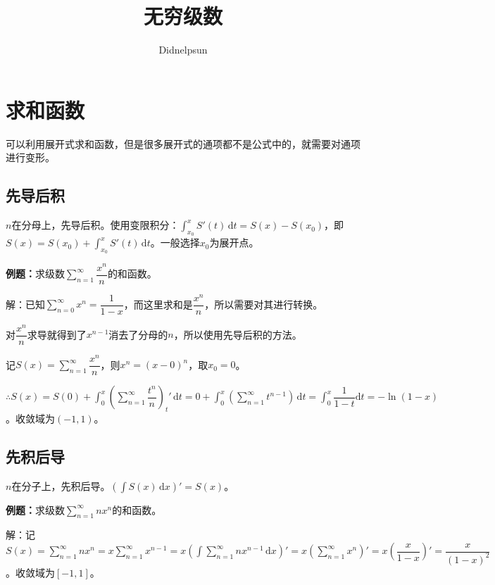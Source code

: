 \documentclass[UTF8, 12pt]{ctexart}
\author{Didnelpsun}
\title{无穷级数}
\date{}
\begin{document}
\maketitle
\pagestyle{empty}
\thispagestyle{empty}
\tableofcontents
\thispagestyle{empty}
\newpage
\pagestyle{plain}
\setcounter{page}{1}
\section{求和函数}

可以利用展开式求和函数，但是很多展开式的通项都不是公式中的，就需要对通项进行变形。

\subsection{先导后积}

$n$在分母上，先导后积。使用变限积分：$\int_{x_0}^xS'(t)\,\textrm{d}t=S(x)-S(x_0)$，即$S(x)=S(x_0)+\int_{x_0}^xS'(t)\,\textrm{d}t$。一般选择$x_0$为展开点。

\textbf{例题：}求级数$\sum\limits_{n=1}^\infty\dfrac{x^n}{n}$的和函数。

解：已知$\sum\limits_{n=0}^\infty x^n=\dfrac{1}{1-x}$，而这里求和是$\dfrac{x^n}{n}$，所以需要对其进行转换。

对$\dfrac{x^n}{n}$求导就得到了$x^{n-1}$消去了分母的$n$，所以使用先导后积的方法。

记$S(x)=\sum\limits_{n=1}^\infty\dfrac{x^n}{n}$，则$x^n=(x-0)^n$，取$x_0=0$。

$\therefore S(x)=S(0)+\displaystyle{\int_0^x\left(\sum\limits_{n=1}^\infty\dfrac{t^n}{n}\right)_t'\,\textrm{d}t}=0+\int_0^x(\sum\limits_{n=1}^\infty t^{n-1})\,\textrm{d}t=\displaystyle{\int_0^x\dfrac{1}{1-t}\textrm{d}t}=-\ln(1-x)$。收敛域为$(-1,1)$。


\subsection{先积后导}

$n$在分子上，先积后导。$(\int S(x)\,\textrm{d}x)'=S(x)$。

\textbf{例题：}求级数$\sum\limits_{n=1}^\infty nx^n$的和函数。

解：记$S(x)=\sum\limits_{n=1}^\infty nx^n=x\sum\limits_{n=1}^\infty x^{n-1}=x(\int\sum\limits_{n=1}^\infty nx^{n-1}\,\textrm{d}x)'=x(\sum\limits_{n=1}^\infty x^n)'=x\left(\dfrac{x}{1-x}\right)'=\dfrac{x}{(1-x)^2}$。收敛域为$[-1,1]$。
\end{document}
